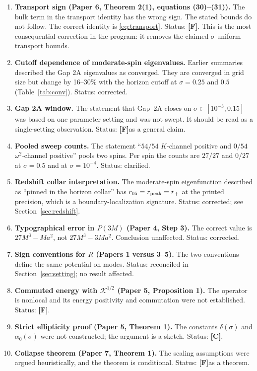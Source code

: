 \documentclass[11pt,a4paper]{article}
\newcommand{\CC}{\textcolor{cc}{\textbf{[C]}}}
\newcommand{\FF}{\textcolor{ff}{\textbf{[F]}}}
\theoremstyle{remark}
\theoremstyle{definition}
\begin{document}
\begin{enumerate}[leftmargin=*, label=E\arabic*.]
\item \textbf{Transport sign (Paper 6, Theorem 2(1), equations (30)--(31)).} The bulk term in the transport identity has the wrong sign. The stated bounds do not follow. The correct identity is \eqref{eq:transport}. Status: \FF. This is the most consequential correction in the program: it removes the claimed $\sigma$-uniform transport bounds.
\item \textbf{Cutoff dependence of moderate-spin eigenvalues.} Earlier summaries described the Gap 2A eigenvalues as converged. They are converged in grid size but change by 16--30\% with the horizon cutoff at $\sigma=0.25$ and $0.5$ (Table~\ref{tab:conv}). Status: corrected.
\item \textbf{Gap 2A window.} The statement that Gap~2A closes on $\sigma\in[10^{-3},0.15]$ was based on one parameter setting and was not swept. It should be read as a single-setting observation. Status: \FF as a general claim.
\item \textbf{Pooled sweep counts.} The statement ``$54/54$ $K$-channel positive and $0/54$ $\omega^2$-channel positive'' pools two spins. Per spin the counts are $27/27$ and $0/27$ at $\sigma=0.5$ and at $\sigma=10^{-4}$. Status: clarified.
\item \textbf{Redshift collar interpretation.} The moderate-spin eigenfunction described as ``pinned in the horizon collar'' has $r_{05} = r_{\rm peak} = r_+$ at the printed precision, which is a boundary-localization signature. Status: corrected; see Section~\ref{sec:redshift}.
\item \textbf{Typographical error in $P(3M)$ (Paper 4, Step 3).} The correct value is $27M^3 - Ma^2$, not $27M^3 - 3Ma^2$. Conclusion unaffected. Status: corrected.
\item \textbf{Sign conventions for $R$ (Papers 1 versus 3--5).} The two conventions define the same potential on modes. Status: reconciled in Section~\ref{sec:setting}; no result affected.
\item \textbf{Commuted energy with $\mathcal{K}^{1/2}$ (Paper 5, Proposition 1).} The operator is nonlocal and its energy positivity and commutation were not established. Status: \FF.
\item \textbf{Strict ellipticity proof (Paper 5, Theorem 1).} The constants $\delta(\sigma)$ and $\alpha_0(\sigma)$ were not constructed; the argument is a sketch. Status: \CC.
\item \textbf{Collapse theorem (Paper 7, Theorem 1).} The scaling assumptions were argued heuristically, and the theorem is conditional. Status: \FF as a theorem.

\end{enumerate}
\end{document}

